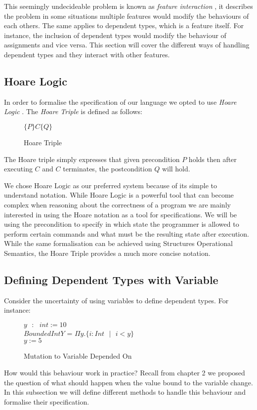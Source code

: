 \documentclass[a4paper,12pt]{report}
\begin{document}
\par
This seemingly undecideable problem is known as \textit{feature interaction} 
\cite{featInteract}, it describes the problem in some situations multiple 
features would modify the behaviours of each others. The same applies to 
dependent types, which is a feature itself. For instance, the inclusion of dependent types 
would modify the behaviour of assignments and vice versa. This section 
will cover the different ways of handling dependent types and they interact with 
other features.

\subsection{Hoare Logic}
In order to formalise the specification of our language we opted to use 
\textit{Hoare Logic} \cite{hoare}. The \textit{Hoare Triple} is defined as follows: 

\begin{figure}[H]
  \begin{center}
    $\{P\}C\{Q\}$
  \end{center}
  \caption{Hoare Triple}
\end{figure}
The Hoare triple simply expresses that given precondition $P$ holds then after executing $C$ 
and $C$ terminates, the postcondition $Q$ will hold.

\par
We chose Hoare Logic as our preferred system because of its simple to understand 
notation. While Hoare Logic is a powerful tool that can become complex when 
reasoning about the correctness of a program we are mainly interested in using 
the Hoare notation as a tool for specifications. We will be using the 
precondition to specify in which state the programmer is allowed to perform 
certain commands and what must be the resulting state after execution. While the 
same formalisation can be achieved using Structures Operational Semantics, the 
Hoare Triple provides a much more concise notation. 


\subsection{Defining Dependent Types with Variable}
Consider the uncertainty of using variables to define dependent types. For 
instance: 

\begin{figure} [H]
  \begin{center}
    $y\text{ }:\text{ }int := 10$ \\
    $BoundedIntY$ = $\Pi y. \{i : Int\text{ }|\text{ }i < y\}$ \\ 
    $y := 5$
  \end{center}
  \caption{Mutation to Variable Depended On}
\end{figure}
\par
How would this behaviour work in practice? Recall from chapter 2 we proposed the 
question of what should happen when the value bound to the variable change. In 
this subsection we will define different methods to handle this behaviour and 
formalise their specification.
\end{document}
